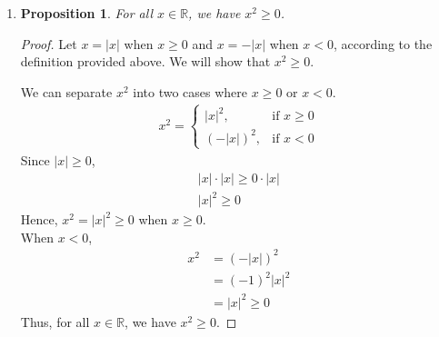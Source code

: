 \documentclass{article}
\newtheorem{prop}[thm]{Proposition}
\begin{document}
\begin{enumerate}
\begin{enumerate}
    \item \begin{prop}
    There exist a different 2 x 2 matrix over $\mathbb{R}$ such that its determinant is the same as the matrix in part(a).
    \end{prop}
    \begin{proof}
    Let $A = \begin{pmatrix}
            a & b \\
            c & d \\
        \end{pmatrix}$ and 
        $B = \begin{pmatrix}
            d & b \\
            c & a \\
        \end{pmatrix}$, where $a, b ,c, d$ are real numbers. We will show that $B$ and $A$ have the same determinant.
        \begin{gather}
            det(A) = ad - bc = da - bc = det(B)
        \end{gather}
        Thus, $A$ is not a unique matrix that has its determinant.
    \end{proof}
\end{enumerate}

\item \begin{prop}
    For all $x \in \mathbb{R}$, we have $x^2 \geq 0$.
\end{prop}
\begin{proof}
Let $x = |x|$ when $x \geq 0$ and $x = -|x|$ when $x < 0$, according to the definition provided above. We will show that $x^2 \geq 0$. 


We can separate $x^2$ into two cases where $x \geq 0$ or $x < 0$.
\begin{gather}
      x^2 =  
\begin{cases}
    |x|^2,& \text{if } x\geq 0\\
    (-|x|)^2,& \text{if } x < 0
\end{cases}
\end{gather}
Since $|x| \geq 0$, 
\begin{gather}
    |x|\cdot |x| \geq 0 \cdot |x| \\
    |x|^2 \geq 0
\end{gather}
Hence, $x^2 = |x|^2 \geq 0$ when $x \geq 0$. \\
When $x < 0$,
\begin{align}
    x^2 &= (-|x|)^2 \\ 
    &= (-1)^2|x|^2 \\
    &= |x|^2 \geq 0
\end{align}
Thus, for all $x \in \mathbb{R}$, we have $x^2 \geq 0$.
\end{proof}


\end{enumerate}
\end{document}
